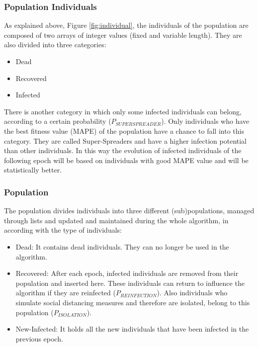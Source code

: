 \documentclass[letterpaper]{article}%
\begin{document}
\subsubsection{Population Individuals}
	As explained above, Figure \ref{fig:individual}, the individuals of the population are composed of two arrays of integer values (fixed and variable length). They are also divided into three categories:
\begin{itemize}
\item Dead
\item Recovered
\item Infected
\end{itemize}
There is another category in which only some infected individuals can belong, according to a certain probability ($P_{SUPERSPREADER}$). Only individuals who have the best fitness value (MAPE) of the population have a chance to fall into this category. They are called Super-Spreaders and have a higher infection potential than other individuals. In this way the evolution of infected individuals of the following epoch will be based on individuals with good MAPE value and will be statistically better.

\subsubsection{Population}
	The population divides individuals into three different (sub)populations, managed through lists and updated and maintained during the whole algorithm, in according with the type of individuals:
\begin{itemize}
\item Dead: It contains dead individuals. They can no longer be used in the algorithm.
\item Recovered: After each epoch, infected individuals are removed from their population and inserted here. These individuals can return to influence the algorithm if they are reinfected ($P_{REINFECTION}$). Also individuals who simulate social distancing measures and therefore are isolated, belong to this population ($P_{ISOLATION}$).
\item New-Infected: It holds all the new individuals that have been infected in the previous epoch.
\end{itemize}
\end{document}
